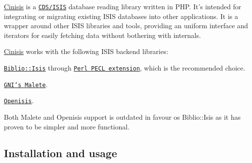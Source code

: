 \hyperlink{classCinisis}{Cinisis} is a \href{https://secure.wikimedia.org/wikipedia/en/wiki/CDS/ISIS}{\tt CDS/ISIS} database reading library written in PHP. It's intended for integrating or migrating existing ISIS databases into other applications. It is a wrapper around other ISIS libraries and tools, providing an uniform interface and iterators for easily fetching data without bothering with internals.

\hyperlink{classCinisis}{Cinisis} works with the following ISIS backend libraries:


\begin{DoxyItemize}
\item \href{http://search.cpan.org/~dpavlin/Biblio-Isis-0.24/lib/Biblio/Isis.pm}{\tt Biblio::Isis} through \href{http://pecl.php.net/package/perl}{\tt Perl PECL extension}, which is the recommended choice.
\item \href{http://malete.org}{\tt GNI's Malete}.
\item \href{http://pecl.php.net/package/isis}{\tt Openisis}.
\end{DoxyItemize}

Both Malete and Openisis support is outdated in favour os Biblio::Isis as it has proven to be simpler and more functional.

\subsection*{Installation and usage}


